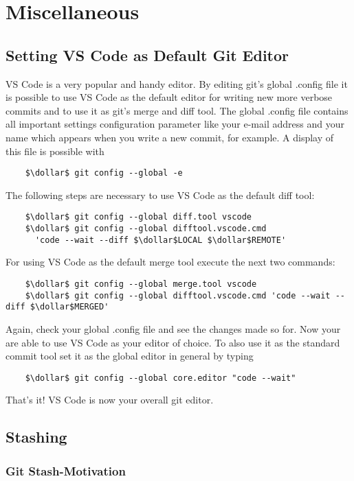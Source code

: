 \chapter{Miscellaneous}
\label{chapter:Miscellaneous}

\section{Setting VS Code as Default Git Editor}
\label{chapter:Miscellaneous.1}

VS Code is a very popular and handy editor. By editing git's global .config file it is possible to use VS Code as the default editor for writing 
new more verbose commits and to use it as git's merge and diff tool. The global .config file contains all important settings configuration parameter
like your e-mail address and your name which appears when you write a new commit, for example.
A display of this file is possible with
\begin{lstlisting}
	$\dollar$ git config --global -e
\end{lstlisting} 
The following steps are necessary to use VS Code as the default diff tool:
\begin{lstlisting}
	$\dollar$ git config --global diff.tool vscode
	$\dollar$ git config --global difftool.vscode.cmd 
	  'code --wait --diff $\dollar$LOCAL $\dollar$REMOTE'
\end{lstlisting}
For using VS Code as the default merge tool execute the next two commands:
\begin{lstlisting}
	$\dollar$ git config --global merge.tool vscode
	$\dollar$ git config --global difftool.vscode.cmd 'code --wait --diff $\dollar$MERGED'
\end{lstlisting}
Again, check your global .config file and see the changes made so for. Now your are able to use 
VS Code as your editor of choice. To also use it as the standard commit tool set it as the global editor in general by typing 
\begin{lstlisting}
	$\dollar$ git config --global core.editor "code --wait"
\end{lstlisting}
That's it! VS Code is now your overall git editor.




\section{Stashing}
\label{chapter:Miscellaneous.2}

\subsection*{Git Stash-Motivation}

